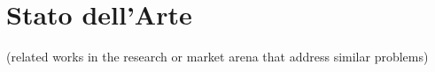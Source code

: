 \section{Stato dell'Arte} \label{sec:stato}
(related works in the research or market arena that address similar problems)